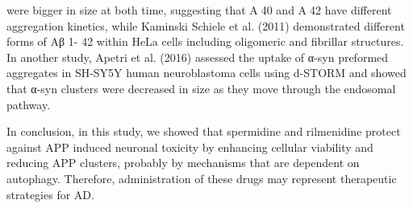 were bigger in size at both time, suggesting that A40 and A42 have different aggregation kinetics, while Kaminski Schiele et al. (2011) demonstrated different forms of Aβ 1- 42 within HeLa cells including oligomeric and fibrillar structures. In another study, Apetri et al. (2016) assessed the uptake of α-syn preformed aggregates in SH-SY5Y human neuroblastoma cells using d-STORM and showed that α-syn clusters were decreased in size as they move through the endosomal pathway. 

In conclusion, in this study, we showed that spermidine and rilmenidine protect against APP induced neuronal toxicity by enhancing cellular viability and reducing APP clusters, probably by mechanisms that are dependent on autophagy. Therefore, administration of these drugs may represent therapeutic strategies for AD. 




























